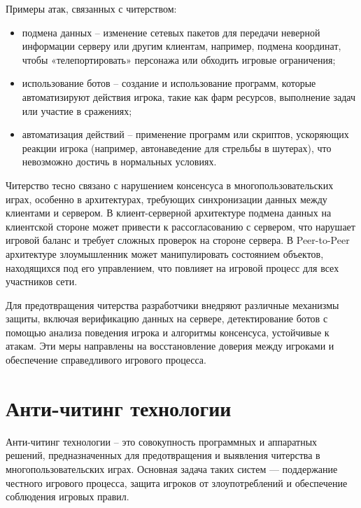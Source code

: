 Примеры атак, связанных с читерством:
\begin{itemize}
	\item подмена данных -- изменение сетевых пакетов для передачи неверной информации серверу или другим клиентам, например, подмена координат, чтобы «телепортировать» персонажа или обходить игровые ограничения;
	\item использование ботов -- создание и использование программ, которые автоматизируют действия игрока, такие как фарм ресурсов, выполнение задач или участие в сражениях;
	\item автоматизация действий -- применение программ или скриптов, ускоряющих реакции игрока (например, автонаведение для стрельбы в шутерах), что невозможно достичь в нормальных условиях.
\end{itemize}

Читерство тесно связано с нарушением консенсуса в многопользовательских играх, особенно в архитектурах, требующих синхронизации данных между клиентами и сервером. В клиент-серверной архитектуре подмена данных на клиентской стороне может привести к рассогласованию с сервером, что нарушает игровой баланс и требует сложных проверок на стороне сервера. В Peer-to-Peer архитектуре злоумышленник может манипулировать состоянием объектов, находящихся под его управлением, что повлияет на игровой процесс для всех участников сети.

Для предотвращения читерства разработчики внедряют различные механизмы защиты, включая верификацию данных на сервере, детектирование ботов с помощью анализа поведения игрока и алгоритмы консенсуса, устойчивые к атакам. Эти меры направлены на восстановление доверия между игроками и обеспечение справедливого игрового процесса.

\section{Анти-читинг технологии}
Анти-читинг технологии -- это совокупность программных и аппаратных решений, предназначенных для предотвращения и выявления читерства в многопользовательских играх. Основная задача таких систем — поддержание честного игрового процесса, защита игроков от злоупотреблений и обеспечение соблюдения игровых правил.

